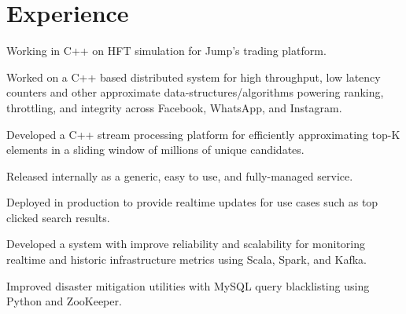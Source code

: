 \documentclass[]{resume}
\begin{document}
\begin{minipage}[t]{0.66\textwidth}


\section{Experience}

\vspace{\topsep} %
\begin{tightemize}
\item Working in C++ on HFT simulation for Jump's trading platform.
\end{tightemize}
\sectionsep

\begin{tightemize}
\item Worked on a C++ based distributed system for high throughput, low latency counters and other approximate data-structures/algorithms powering ranking, throttling, and integrity across Facebook, WhatsApp, and Instagram.
\end{tightemize}
\sectionsep

\begin{tightemize}
\item Developed a C++ stream processing platform for efficiently approximating top-K elements in a sliding window of millions of unique candidates.
\item Released internally as a generic, easy to use, and fully-managed service.
\item Deployed in production to provide realtime updates for use cases such as top clicked search results.
\end{tightemize}
\sectionsep

\begin{tightemize}
\item Developed a system with improve reliability and scalability for monitoring realtime and historic infrastructure metrics using Scala, Spark, and Kafka.
\item Improved disaster mitigation utilities with MySQL query blacklisting using Python and ZooKeeper.
\end{tightemize}
\sectionsep


\end{minipage}
\end{document}
